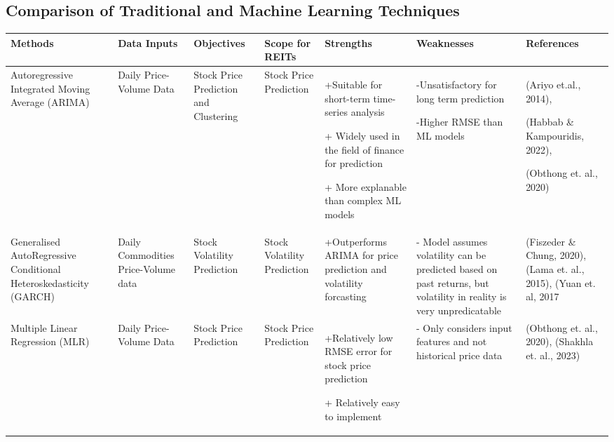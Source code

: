\documentclass[a4paper,12pt]{report}
\numberwithin{equation}{section}
\theoremstyle{definition}
\begin{document}
\begin{landscape}
  \section{Comparison of Traditional and Machine Learning Techniques}
  \begin{table}[H]
    \begin{adjustwidth}{-1.25cm}{-1.25cm}
    \begin{tabular}{|p{2.6cm}|p{2.7cm}|p{2.7cm}|p{3.5cm}|p{5cm}|p{5cm}|p{4cm}|}
    \hline
    \textbf{Methods} & \textbf{Data Inputs} & \textbf{Objectives} & \textbf{Scope for REITs} & \textbf{Strengths} & \textbf{Weaknesses} & \textbf{References}  
    \\ \hline Autoregressive Integrated Moving Average (ARIMA) & Daily Price-Volume Data & Stock Price Prediction and Clustering & Stock Price Prediction & +Suitable for short-term time-series analysis \par+ Widely used in the field of finance for prediction \par+ More explanable than complex ML models & \par-Unsatisfactory for long term prediction \par-Higher RMSE than ML models   & (Ariyo et.al., 2014),\par (Habbab \& Kampouridis, 2022),\par   (Obthong et. al., 2020)        
    \\ \hline Generalised AutoRegressive Conditional Heteroskedasticity (GARCH) & Daily Commodities Price-Volume data & Stock Volatility Prediction & Stock Volatility Prediction & +Outperforms ARIMA for price prediction and volatility forcasting & - Model assumes volatility can be predicted based on past returns, but volatility in reality is very unpredicatable & (Fiszeder \& Chung, 2020),   (Lama et. al., 2015), (Yuan et. al, 2017           
    \\ \hline Multiple Linear Regression (MLR) & Daily Price-Volume Data & Stock Price Prediction & Stock Price Prediction & +Relatively low RMSE error for stock price prediction \par+ Relatively easy to implement & - Only considers input features and not historical price data  & (Obthong et. al., 2020), (Shakhla et. al., 2023)
    \\ \hline 
    \end{tabular}
  \end{adjustwidth}
  \end{table}

\end{landscape}
\end{document}
